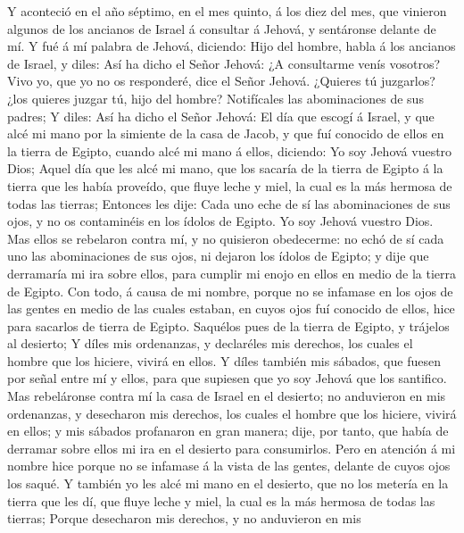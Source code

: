  Y aconteció en el año séptimo, en el mes quinto, á los diez
del mes, que vinieron algunos de los ancianos de Israel á consultar á
Jehová, y sentáronse delante de mí.  Y fué á mí palabra de
Jehová, diciendo:  Hijo del hombre, habla á los ancianos de
Israel, y diles: Así ha dicho el Señor Jehová: ¿A consultarme venís
vosotros? Vivo yo, que yo no os responderé, dice el Señor Jehová.
 ¿Quieres tú juzgarlos? ¿los quieres juzgar tú, hijo del
hombre? Notifícales las abominaciones de sus padres;  Y
diles: Así ha dicho el Señor Jehová: El día que escogí á Israel, y que
alcé mi mano por la simiente de la casa de Jacob, y que fuí conocido de
ellos en la tierra de Egipto, cuando alcé mi mano á ellos, diciendo: Yo
soy Jehová vuestro Dios;  Aquel día que les alcé mi mano,
que los sacaría de la tierra de Egipto á la tierra que les había
proveído, que fluye leche y miel, la cual es la más hermosa de todas las
tierras;  Entonces les dije: Cada uno eche de sí las
abominaciones de sus ojos, y no os contaminéis en los ídolos de Egipto.
Yo soy Jehová vuestro Dios.  Mas ellos se rebelaron contra
mí, y no quisieron obedecerme: no echó de sí cada uno las abominaciones
de sus ojos, ni dejaron los ídolos de Egipto; y dije que derramaría mi
ira sobre ellos, para cumplir mi enojo en ellos en medio de la tierra de
Egipto.  Con todo, á causa de mi nombre, porque no se
infamase en los ojos de las gentes en medio de las cuales estaban, en
cuyos ojos fuí conocido de ellos, hice para sacarlos de tierra de
Egipto.  Saquélos pues de la tierra de Egipto, y trájelos
al desierto;  Y díles mis ordenanzas, y declaréles mis
derechos, los cuales el hombre que los hiciere, vivirá en ellos.
 Y díles también mis sábados, que fuesen por señal entre mí
y ellos, para que supiesen que yo soy Jehová que los santifico.
 Mas rebeláronse contra mí la casa de Israel en el
desierto; no anduvieron en mis ordenanzas, y desecharon mis derechos,
los cuales el hombre que los hiciere, vivirá en ellos; y mis sábados
profanaron en gran manera; dije, por tanto, que había de derramar sobre
ellos mi ira en el desierto para consumirlos.  Pero en
atención á mi nombre hice porque no se infamase á la vista de las
gentes, delante de cuyos ojos los saqué.  Y también yo les
alcé mi mano en el desierto, que no los metería en la tierra que les dí,
que fluye leche y miel, la cual es la más hermosa de todas las tierras;
 Porque desecharon mis derechos, y no anduvieron en mis
